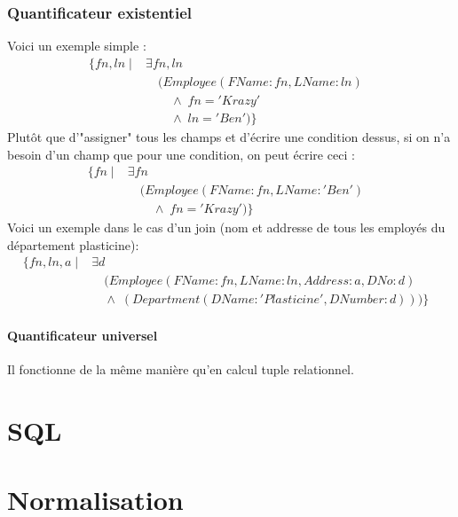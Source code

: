 \documentclass[a4paper]{article}
\begin{document}
  \subsubsection{Quantificateur existentiel}
  Voici un exemple simple :
  \begin{align*}
    \{fn, ln\; |\; &\exists fn, ln & \\
    &\quad(Employee(FName:fn, LName:ln)\\
    &\quad\quad\land\;fn='Krazy'\\
    &\quad\quad\land\; ln='Ben')\}
  \end{align*}
  Plutôt que d'"assigner" tous les champs et d'écrire une condition dessus,
  si on n'a besoin d'un champ que pour une condition, on peut écrire ceci :
  \begin{align*}
    \{fn\; |\; &\exists fn & \\
    &\quad(Employee(FName:fn, LName:'Ben')\\
    &\quad\quad\land\;fn='Krazy')\}
  \end{align*}
  Voici un exemple dans le cas d'un join (nom et addresse de tous les employés
  du département plasticine):
  \begin{align*}
    \{fn, ln, a\; |\; &\exists d & \\
    &\quad(Employee(FName:fn, LName:ln, Address:a, DNo:d)\\
    &\quad\land\;(Department(DName:'Plasticine', DNumber:d)))\}
  \end{align*}

  \paragraph{Quantificateur universel}
  Il fonctionne de la même manière qu'en calcul tuple relationnel.


\section{SQL}


\section{Normalisation}
\end{document}
